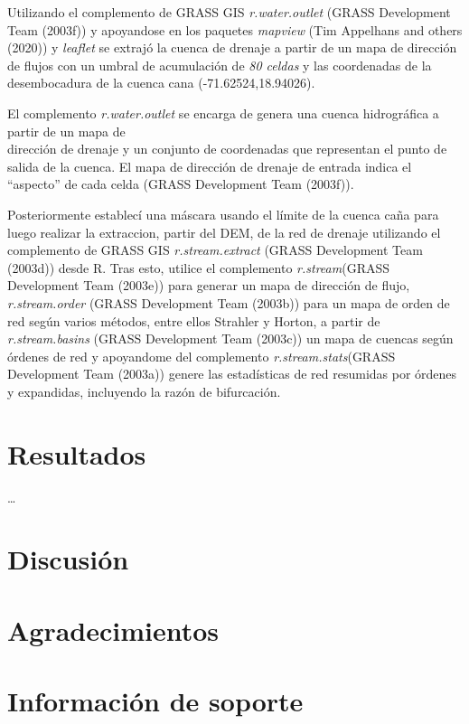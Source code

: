 \documentclass[11pt,]{article}
\begin{document}
Utilizando el complemento de GRASS GIS \emph{r.water.outlet} (GRASS
Development Team (2003f)) y apoyandose en los paquetes \emph{mapview}
(Tim Appelhans and others (2020)) y \emph{leaflet} se extrajó la cuenca
de drenaje a partir de un mapa de dirección de flujos con un umbral de
acumulación de \emph{80 celdas} y las coordenadas de la desembocadura de
la cuenca cana (-71.62524,18.94026).

El complemento \emph{r.water.outlet} se encarga de genera una cuenca
hidrográfica a partir de un mapa de\\
dirección de drenaje y un conjunto de coordenadas que representan el
punto de salida de la cuenca. El mapa de dirección de drenaje de entrada
indica el ``aspecto'' de cada celda (GRASS Development Team (2003f)).

Posteriormente establecí una máscara usando el límite de la cuenca caña
para luego realizar la extraccion, partir del DEM, de la red de drenaje
utilizando el complemento de GRASS GIS \emph{r.stream.extract} (GRASS
Development Team (2003d)) desde R. Tras esto, utilice el complemento
\emph{r.stream}(GRASS Development Team (2003e)) para generar un mapa de
dirección de flujo, \emph{r.stream.order} (GRASS Development Team
(2003b)) para un mapa de orden de red según varios métodos, entre ellos
Strahler y Horton, a partir de \emph{r.stream.basins} (GRASS Development
Team (2003c)) un mapa de cuencas según órdenes de red y apoyandome del
complemento \emph{r.stream.stats}(GRASS Development Team (2003a)) genere
las estadísticas de red resumidas por órdenes y expandidas, incluyendo
la razón de bifurcación.

\section{Resultados}\label{resultados}

\ldots

\section{Discusión}\label{discusiuxf3n}

\section{Agradecimientos}\label{agradecimientos}

\section{Información de soporte}\label{informaciuxf3n-de-soporte}
\end{document}
